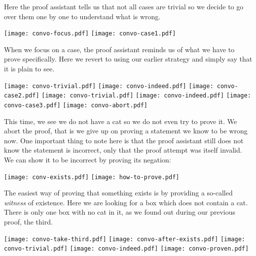 Here the proof assistant tells us that not all cases are trivial so we decide
to go over them one by one to understand what is wrong.

\begin{center}
  \texttt{[image: convo-focus.pdf]}
  \texttt{[image: convo-case1.pdf]}
\end{center}

When we focus on a case, the proof assistant reminds us of what we have to prove
specifically. Here we revert to using our earlier strategy and simply say that
it is plain to see.

\begin{center}
  \texttt{[image: convo-trivial.pdf]}
  \texttt{[image: convo-indeed.pdf]}
  \texttt{[image: convo-case2.pdf]}
  \texttt{[image: convo-trivial.pdf]}
  \texttt{[image: convo-indeed.pdf]}
  \texttt{[image: convo-case3.pdf]}
  \texttt{[image: convo-abort.pdf]}
\end{center}

This time, we see we do not have a cat so we do not even try to prove it.
We abort the proof, that is we give up on proving a statement we know to be
wrong now.
One important thing to note here is that the proof assistant still does not
know the statement is incorrect, only that the proof attempt was itself invalid.
We can show it to be incorrect by proving its negation:

\begin{center}
  \texttt{[image: conv-exists.pdf]}
  \texttt{[image: how-to-prove.pdf]}
\end{center}

The easiest way of proving that something exists is by providing a so-called
\emph{witness} of existence. Here we are looking for a box which does not
contain a cat. There is only one box with no cat in it, as we found out during
our previous proof, the third.

\begin{center}
  \texttt{[image: convo-take-third.pdf]}
  \texttt{[image: convo-after-exists.pdf]}
  \texttt{[image: convo-trivial.pdf]}
  \texttt{[image: convo-indeed.pdf]}
  \texttt{[image: convo-proven.pdf]}
\end{center}

